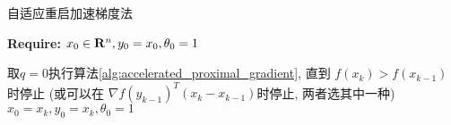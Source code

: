 \begin{algorithm}
\caption{自适应重启加速梯度法\cite{o2015adaptive}}
\label{alg:adaptive_restart_accelerated_proximal_gradient}
{\bf Require:} $x_0\in {\bf R}^n, y_0=x_0, \theta_0=1$
\begin{algorithmic}[1]
	\State 取$q=0$执行算法\ref{alg:accelerated_proximal_gradient}, 直到 $f(x_k)>f(x_{k-1})$时停止 (或可以在 $\nabla f(y_{k-1})^T(x_k-x_{k-1})$时停止, 两者选其中一种)
	\State $x_0=x_k, y_0=x_k, \theta_0=1$
\EndFor
\end{algorithmic}
\end{algorithm}
